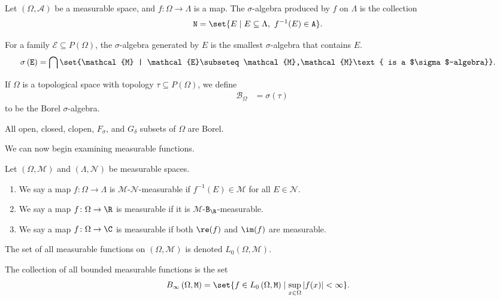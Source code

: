 \begin{definition}
Let $\left(\Omega,\mathcal{A}\right)$ be a measurable space, and $f\colon \Omega\rightarrow \Lambda$ is a map. The $\sigma$-algebra produced by $f$ on $\Lambda$ is the collection
\begin{align*}
  \mathcal{N} &= \set{E\mid E\subseteq \Lambda,~f^{-1}(E) \in \mathcal{A}}.
\end{align*}

\end{definition}

\begin{definition}
  For a family $\mathcal{E}\subseteq P\left(\Omega\right)$, the $\sigma$-algebra generated by $E$ is the smallest $\sigma$-algebra that contains $E$.
  \begin{align*}
    \sigma\left(\mathcal{E}\right) &= \bigcap\set{\mathcal{M} | \mathcal{E}\subseteq \mathcal{M},\mathcal{M}\text{ is a $\sigma$-algebra}}.
  \end{align*}
\end{definition}
\begin{definition}
  If $\Omega$ is a topological space with topology $\tau\subseteq P(\Omega)$, we define
  \begin{align*}
    \mathcal{B}_{\Omega} &= \sigma\left(\tau\right)
  \end{align*}
  to be the Borel $\sigma$-algebra.
\end{definition}
All open, closed, clopen, $F_{\sigma}$, and $G_{\delta}$ subsets of $\Omega$ are Borel.\break

We can now begin examining measurable functions.
\begin{definition}
  Let $\left(\Omega,\mathcal{M}\right)$ and $\left(\Lambda,\mathcal{N}\right)$ be measurable spaces.
  \begin{enumerate}[(1)]
    \item We say a map $f\colon \Omega\rightarrow \Lambda$ is $\mathcal{M}$-$\mathcal{N}$-measurable if $f^{-1}\left(E\right)\in \mathcal{M}$ for all $E\in \mathcal{N}$.
    \item We say a map $f\colon \Omega\rightarrow \R$ is measurable if it is $\mathcal{M}$-$\mathcal{B}_{\R}$-measurable.
    \item We say a map $f\colon \Omega\rightarrow \C$ is measurable if both $\re(f)$ and $\im(f)$ are measurable.
  \end{enumerate}
  The set of all measurable functions on $\left(\Omega,\mathcal{M}\right)$ is denoted $L_{0}\left(\Omega,\mathcal{M}\right)$.\newline

  The collection of all bounded measurable functions is the set
  \begin{align*}
    B_{\infty}\left(\Omega,\mathcal{M}\right) &= \set{f\in L_0\left(\Omega,\mathcal{M}\right)\mid \sup_{x\in\Omega}\left\vert f(x) \right\vert < \infty}.
  \end{align*}
\end{definition}

